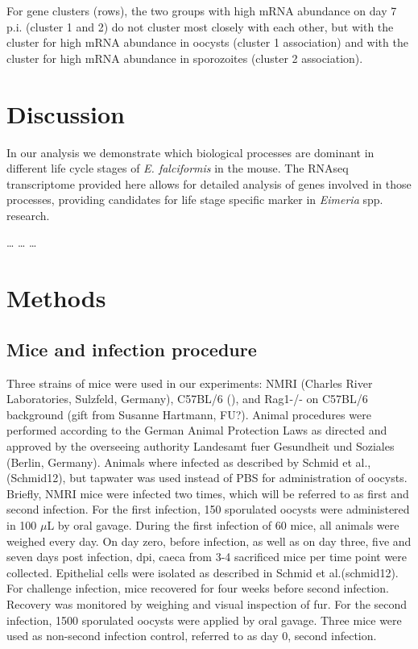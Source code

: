 \documentclass{bmcart}
\begin{document}
For gene clusters (rows), the two groups with high mRNA abundance on day 7 p.i. (cluster 1 and 2)
do not cluster most closely with each other, but with the cluster for high mRNA abundance in oocysts
(cluster 1 association) and with the cluster for high mRNA abundance in sporozoites (cluster 2 
association).


\section*{Discussion}
In our analysis we demonstrate which biological processes are dominant in different
life cycle stages of \textit{E. falciformis} in the mouse. The RNAseq transcriptome provided here 
allows for detailed analysis of genes involved in those processes, providing candidates for 
life stage specific marker in \textit{Eimeria} spp. research. 

\ldots
\ldots
\ldots


\section{Methods}
\subsection{Mice and infection procedure}
Three strains of mice were used in our experiments: NMRI (Charles
River Laboratories, Sulzfeld, Germany), C57BL/6 (), and Rag1-/- on
C57BL/6 background (gift from Susanne Hartmann, FU?).  Animal
procedures were performed according to the German Animal Protection
Laws as directed and approved by the overseeing authority Landesamt
fuer Gesundheit und Soziales (Berlin, Germany). Animals where infected
as described by Schmid et al., (Schmid12), but tapwater was used
instead of PBS for administration of oocysts. Briefly, NMRI mice were
infected two times, which will be referred to as first and second
infection. For the first infection, 150 sporulated oocysts were
administered in 100 $μ$L by oral gavage. During the first infection of
60 mice, all animals were weighed every day. On day zero, before
infection, as well as on day three, five and seven days post
infection, dpi, caeca from 3-4 sacrificed mice per time point were
collected. Epithelial cells were isolated as described in Schmid et
al.(schmid12). For challenge infection, mice recovered for four weeks
before second infection.  Recovery was monitored by weighing and
visual inspection of fur. For the second infection, 1500 sporulated
oocysts were applied by oral gavage. Three mice were used as
non-second infection control, referred to as day 0, second infection.
\end{document}
